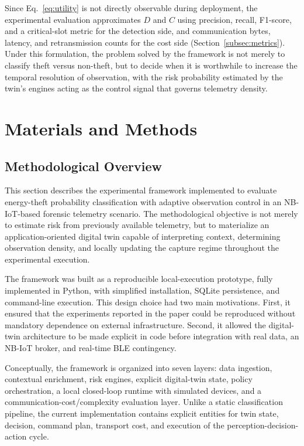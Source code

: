 \documentclass{ieeeaccess}
\begin{document}
Since Eq.~\eqref{eq:utility} is not directly observable during deployment, the experimental evaluation approximates $D$ and $C$ using precision, recall, F1-score, and a critical-slot metric for the detection side, and communication bytes, latency, and retransmission counts for the cost side (Section~\ref{subsec:metrics}). Under this formulation, the problem solved by the framework is not merely to classify theft versus non-theft, but to decide when it is worthwhile to increase the temporal resolution of observation, with the risk probability estimated by the twin's engines acting as the control signal that governs telemetry density.

\section{Materials and Methods}
\label{sec:Materials_Methods}
\subsection{Methodological Overview}
This section describes the experimental framework implemented to evaluate energy-theft probability classification with adaptive observation control in an NB-IoT-based forensic telemetry scenario. The methodological objective is not merely to estimate risk from previously available telemetry, but to materialize an application-oriented digital twin capable of interpreting context, determining observation density, and locally updating the capture regime throughout the experimental execution.

The framework was built as a reproducible local-execution prototype, fully implemented in Python, with simplified installation, SQLite persistence, and command-line execution. This design choice had two main motivations. First, it ensured that the experiments reported in the paper could be reproduced without mandatory dependence on external infrastructure. Second, it allowed the digital-twin architecture to be made explicit in code before integration with real data, an NB-IoT broker, and real-time BLE contingency.

Conceptually, the framework is organized into seven layers: data ingestion, contextual enrichment, risk engines, explicit digital-twin state, policy orchestration, a local closed-loop runtime with simulated devices, and a communication-cost/complexity evaluation layer. Unlike a static classification pipeline, the current implementation contains explicit entities for twin state, decision, command plan, transport cost, and execution of the perception-decision-action cycle.
\end{document}
